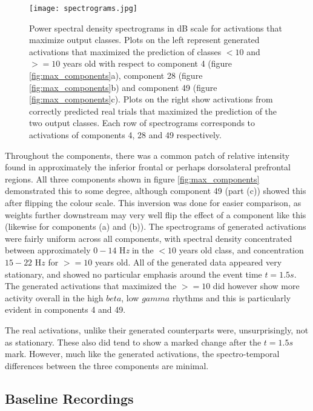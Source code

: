 \documentclass[fleqn,10pt]{wlscirep}
\begin{document}

\begin{figure}[ht]
  \caption{Power spectral density spectrograms in dB scale for activations that maximize output classes. Plots on the left represent generated activations that maximized the prediction of classes $<10$ and $>=10$ years old with respect to component 4 (figure \ref{fig:max_components}a), component 28 (figure \ref{fig:max_components}b) and component 49 (figure \ref{fig:max_components}c). Plots on the right show activations from correctly predicted real trials that maximized the prediction of the two output classes. Each row of spectrograms corresponds to activations of components 4, 28 and 49 respectively.}
  \centering\texttt{[image: spectrograms.jpg]}
 \label{fig:max_spectrograms}
\end{figure}

Throughout the components, there was a common patch of relative intensity found in approximately the inferior frontal or perhaps dorsolateral prefrontal regions. All three components shown in figure \ref{fig:max_components} demonstrated this to some degree, although component 49 (part (c)) showed this after flipping the colour scale. This inversion was done for easier comparison, as weights further downstream may very well flip the effect of a component like this (likewise for components (a) and (b)). The spectrograms of generated activations were fairly uniform across all components, with spectral density concentrated between approximately $0-14$ H{\em z} in the $<10$ years old class, and concentration $15-22$ H$z$ for $>=10$ years old. All of the generated data appeared very stationary, and showed no particular emphasis around the event time $t=1.5s$. The generated activations that maximized the $>=10$ did however show more activity overall in the high $beta$, low $gamma$ rhythms and this is particularly evident in components 4 and 49.

The real activations, unlike their generated counterparts were, unsurprisingly, not as stationary. These also did tend to show a marked change after the $t=1.5s$ mark. However, much like the generated activations, the spectro-temporal differences between the three components are minimal.

\subsection*{Baseline Recordings}
\end{document}
